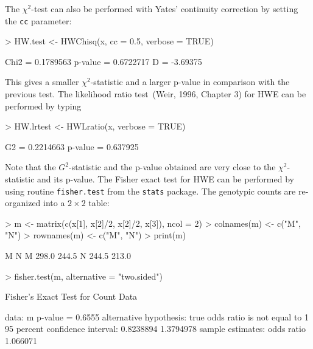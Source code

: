 \documentclass[a4paper]{article}
\begin{document}
The $\chi^2$-test can also be performed with Yates' continuity correction by setting the {\tt cc} parameter:

\begin{Schunk}
\begin{Sinput}
> HW.test <- HWChisq(x, cc = 0.5, verbose = TRUE)
\end{Sinput}
\begin{Soutput}
Chi2 =  0.1789563 p-value =  0.6722717 D =  -3.69375 
\end{Soutput}
\end{Schunk}

This gives a smaller $\chi^2$-statistic and a larger p-value in comparison with the previous test. The likelihood 
ratio test~(Weir, 1996, Chapter 3) for HWE can be performed by typing

\begin{Schunk}
\begin{Sinput}
> HW.lrtest <- HWLratio(x, verbose = TRUE)
\end{Sinput}
\begin{Soutput}
G2 = 0.2214663 p-value = 0.637925 
\end{Soutput}
\end{Schunk}

Note that the $G^2$-statistic and the p-value obtained are very close to the $\chi^2$-statistic
and its p-value. The Fisher exact test for HWE can be performed by using routine {\tt fisher.test}
from the {\tt stats} package. The genotypic counts are re-organized into a $2 \times 2$ table:


\begin{Schunk}
\begin{Sinput}
> m <- matrix(c(x[1], x[2]/2, x[2]/2, x[3]), ncol = 2)
> colnames(m) <- c("M", "N")
> rownames(m) <- c("M", "N")
> print(m)
\end{Sinput}
\begin{Soutput}
      M     N
M 298.0 244.5
N 244.5 213.0
\end{Soutput}
\begin{Sinput}
> fisher.test(m, alternative = "two.sided")
\end{Sinput}
\begin{Soutput}
	Fisher's Exact Test for Count Data

data:  m 
p-value = 0.6555
alternative hypothesis: true odds ratio is not equal to 1 
95 percent confidence interval:
 0.8238894 1.3794978 
sample estimates:
odds ratio 
  1.066071 
\end{Soutput}
\end{Schunk}
\end{document}
